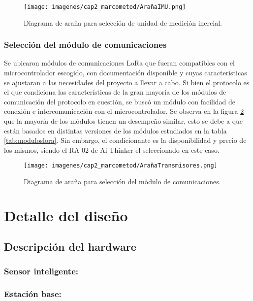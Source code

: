 \begin{figure}[H]
    \centering
    \texttt{[image: imagenes/cap2\_marcometod/ArañaIMU.png]}
    \caption{Diagrama de araña para selección de unidad de medición inercial.}
    \label{fig:arañaimu}
\end{figure}

\subsubsection{Selección del módulo de comunicaciones}

Se ubicaron módulos de comunicaciones LoRa que fueran compatibles con el microcontrolador escogido, con documentación disponible y cuyas características se ajustaran a las necesidades del proyecto a llevar a cabo. Si bien el protocolo es el que condiciona las características de la gran mayoría de los módulos de comunicación del protocolo en cuestión, se buscó un módulo con facilidad de conexión e intercomunicación con el microcontrolador. Se observa en la figura \ref{fig:arañacomm} que la mayoría de los módulos tienen un desempeño similar, esto se debe a que están basados en distintas versiones de los módulos estudiados en la tabla \ref{tab:moduloslora}. Sin embargo, el condicionante es la disponibilidad y precio de los mismos, siendo el RA-02 de Ai-Thinker el seleccionado en este caso.

\begin{figure}[H]
    \centering
    \texttt{[image: imagenes/cap2\_marcometod/ArañaTransmisores.png]}
    \caption{Diagrama de araña para selección del módulo de comunicaciones.}
    \label{fig:arañacomm}
\end{figure}

\section{Detalle del diseño}

\subsection{Descripción del hardware}

\subsubsection{Sensor inteligente:}

\subsubsection{Estación base:}

